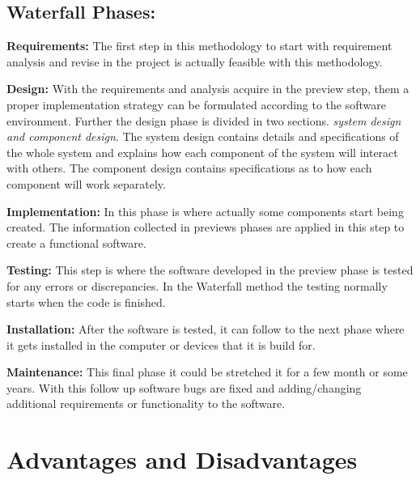 \subsection*{Waterfall Phases:}

\textemdash \textbf{Requirements:} The first step in this methodology to start with requirement analysis and revise in the project is actually feasible with this methodology.

\textbullet \textbf{Design:} With the requirements and analysis acquire in the preview step, them a proper implementation strategy can be formulated according to the software environment. Further the design phase is divided in two sections. \textit{system design and component design}. The system design contains details and specifications of the whole system and explains how each component of the system will interact with others. The component design contains specifications as to how each component will work separately.

\textbullet \textbf{Implementation:} In this phase is where actually some components start being created. The information collected in previews phases are applied in this step to create a functional software.

\textbullet \textbf{Testing:} This step is where the software developed in the preview phase is tested for any errors or discrepancies. In the Waterfall method the testing normally starts when the code is finished.

\textbullet \textbf{Installation:} After the software is tested, it can follow to the next phase where it gets installed in the computer or devices that it is build for.

\textbullet \textbf{Maintenance:} This final phase it could be stretched it for a few month or some years. With this follow up software bugs are fixed and adding/changing additional requirements or functionality to the software.


\section*{Advantages and Disadvantages}

